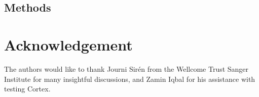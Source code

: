 \documentclass{bioinfo}
\begin{document}

\begin{methods}
  \section{Methods}
  
\end{methods}




%
%








\section*{Acknowledgement}
The authors would like to thank Journi Sir\'{e}n from the Wellcome Trust Sanger Institute for many insightful discussions, and Zamin Iqbal for his assistance with testing {\sc Cortex}.  


%
%
%
%
%
%
%
%
%







\end{document}
